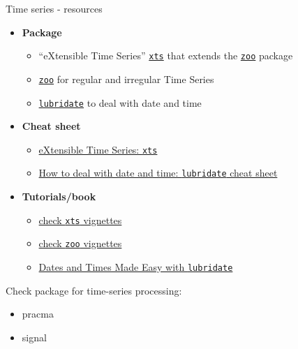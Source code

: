 \documentclass[9pt,ignorenonframetext,]{beamer}
\providecommand{\tightlist}{%
  \setlength{\itemsep}{0pt}\setlength{\parskip}{0pt}}
\begin{document}
\begin{frame}[fragile]{Time series - resources}

\begin{itemize}
\tightlist
\item
  \textbf{Package}

  \begin{itemize}
  \tightlist
  \item
    ``eXtensible Time Series''
    \href{https://cran.r-project.org/web/packages/xts/index.html}{\texttt{xts}}
    that extends the
    \href{https://cran.r-project.org/web/packages/zoo/index.html}{\texttt{zoo}}
    package
  \item
    \href{https://cran.r-project.org/web/packages/zoo/index.html}{\texttt{zoo}}
    for regular and irregular Time Series
  \item
    \href{https://cran.r-project.org/web/packages/lubridate/index.html}{\texttt{lubridate}}
    to deal with date and time
  \end{itemize}
\item
  \textbf{Cheat sheet}

  \begin{itemize}
  \tightlist
  \item
    \href{https://s3.amazonaws.com/assets.datacamp.com/blog_assets/xts_Cheat_Sheet_R.pdf}{eXtensible
    Time Series: \texttt{xts}}
  \item
    \href{https://github.com/rstudio/cheatsheets/raw/master/lubridate.pdf}{How
    to deal with date and time: \texttt{lubridate} cheat sheet}
  \end{itemize}
\item
  \textbf{Tutorials/book}

  \begin{itemize}
  \tightlist
  \item
    \href{https://cran.r-project.org/web/packages/xts/index.html}{check
    \texttt{xts} vignettes}
  \item
    \href{https://cran.r-project.org/web/packages/zoo/index.html}{check
    \texttt{zoo} vignettes}
  \item
    \href{http://vita.had.co.nz/papers/lubridate.pdf}{Dates and Times
    Made Easy with \texttt{lubridate}}
  \end{itemize}
\end{itemize}

Check package for time-series processing:

\begin{itemize}
\tightlist
\item
  pracma
\item
  signal
\end{itemize}

\end{frame}
\end{document}
